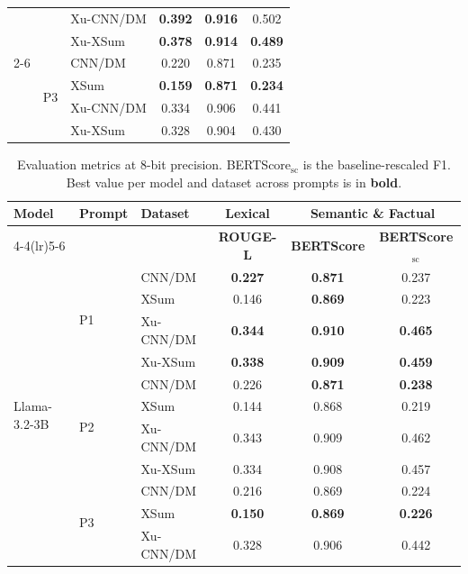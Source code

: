 \begin{table}[H]
\begin{tabular}{lllccc}
 &  & Xu-CNN/DM & \textbf{0.392} & \textbf{0.916} & 0.502 \\
 &  & Xu-XSum & \textbf{0.378} & \textbf{0.914} & \textbf{0.489} \\
\cmidrule(lr){2-6}
 & \multirow{4}{*}{P3} & CNN/DM & 0.220 & 0.871 & 0.235 \\
 &  & XSum & \textbf{0.159} & \textbf{0.871} & \textbf{0.234} \\
 &  & Xu-CNN/DM & 0.334 & 0.906 & 0.441 \\
 &  & Xu-XSum & 0.328 & 0.904 & 0.430 \\
\bottomrule
\end{tabular}
\end{table}

\begin{table}[H]
\centering
\footnotesize
\setlength{\tabcolsep}{4pt}
\caption{Evaluation metrics at 8-bit precision. BERTScore$_{\mathrm{sc}}$ is the baseline-rescaled F1. Best value per model and dataset across prompts is in \textbf{bold}.}
\label{tab:eval-8bit}
\begin{tabular}{lllccc}
\toprule
\multirow{2}{*}{\textbf{Model}} & \multirow{2}{*}{\textbf{Prompt}} & \multirow{2}{*}{\textbf{Dataset}} & \textbf{Lexical} & \multicolumn{2}{c}{\textbf{Semantic \& Factual}} \\
\cmidrule(lr){4-4}\cmidrule(lr){5-6}
 & & & \textbf{ROUGE-L} & \textbf{BERTScore} & \textbf{BERTScore$_{\mathrm{sc}}$} \\
\midrule
\multirow{12}{*}{Llama-3.2-3B} & \multirow{4}{*}{P1} & CNN/DM & \textbf{0.227} & \textbf{0.871} & 0.237 \\
 &  & XSum & 0.146 & \textbf{0.869} & 0.223 \\
 &  & Xu-CNN/DM & \textbf{0.344} & \textbf{0.910} & \textbf{0.465} \\
 &  & Xu-XSum & \textbf{0.338} & \textbf{0.909} & \textbf{0.459} \\
\cmidrule(lr){2-6}
 & \multirow{4}{*}{P2} & CNN/DM & 0.226 & \textbf{0.871} & \textbf{0.238} \\
 &  & XSum & 0.144 & 0.868 & 0.219 \\
 &  & Xu-CNN/DM & 0.343 & 0.909 & 0.462 \\
 &  & Xu-XSum & 0.334 & 0.908 & 0.457 \\
\cmidrule(lr){2-6}
 & \multirow{4}{*}{P3} & CNN/DM & 0.216 & 0.869 & 0.224 \\
 &  & XSum & \textbf{0.150} & \textbf{0.869} & \textbf{0.226} \\
 &  & Xu-CNN/DM & 0.328 & 0.906 & 0.442 \\

\end{tabular}
\end{table}
